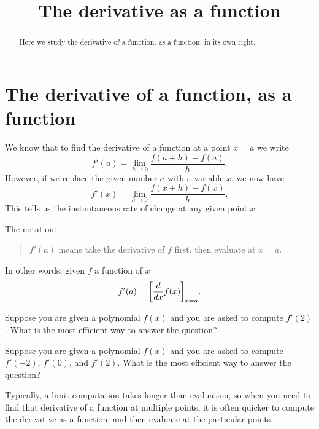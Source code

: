 \documentclass{ximera}
\title[Dig-in:]{The derivative as a function}
\begin{document}
\begin{abstract}
Here we study the derivative of a function, as a function, in its own
right.
\end{abstract}
\maketitle

\section{The derivative of a function, as a function}


We know that to find the derivative of a function at a point $x=a$ we
write
\[
f'(a) = \lim_{h\to 0}\frac{f(a+h)-f(a)}{h}.
\]
However, if we replace the given number $a$ with a variable $x$, we now
have
\[
f'(x) = \lim_{h\to 0}\frac{f(x+h)-f(x)}{h}.
\]
This tells us the instantaneous rate of change at any given point $x$.
\begin{warning}
  The notation:
  \begin{quote}
  $f'(a)$ means take the derivative of $f$ first, then evaluate at
    $x=a$.
  \end{quote}
  In other words, given $f$ a function of $x$
  \[
  f'(a) = \bigg[ \frac{d}{\mathop{}\!d x} f(x) \bigg]_{x=a}.
  \]
\end{warning}

\begin{problem}
Suppose you are given a polynomial $f(x)$ and you are asked to compute $f'(2)$. What is the most efficient way to answer the question?
  \begin{multipleChoice}
  \end{multipleChoice}
 \end{problem}
 
  \begin{problem}
  Suppose you are given a polynomial $f(x)$ and you are asked to compute $f'(-2)$, $f'(0)$, and $f'(2)$. What is the most efficient way to answer the question?
    \begin{multipleChoice}
    \end{multipleChoice}
    \begin{feedback}
    Typically, a limit computation takes longer than evaluation,
    so when you need to find that derivative of a function at multiple points,
    it is often quicker to compute the derivative as a function,
    and then evaluate at the particular points.
    \end{feedback}
  \end{problem}
\end{document}
